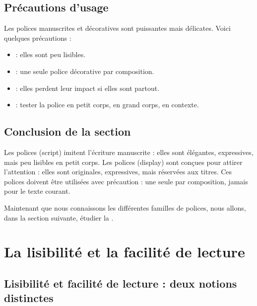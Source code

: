 \subsection{Précautions d'usage}

Les polices manuscrites et décoratives sont puissantes mais délicates. Voici quelques précautions :

\begin{itemize}
    \item {} : elles sont peu lisibles.
    \item {} : une seule police décorative par composition.
    \item {} : elles perdent leur impact si elles sont partout.
    \item {} : tester la police en petit corps, en grand corps, en contexte.
\end{itemize}

\subsection*{Conclusion de la section}

\begin{retenir}
Les polices  (script) imitent l'écriture manuscrite : elles sont élégantes, expressives, mais peu lisibles en petit corps. Les polices  (display) sont conçues pour attirer l'attention : elles sont originales, expressives, mais réservées aux titres. Ces polices doivent être utilisées avec précaution : une seule par composition, jamais pour le texte courant.
\end{retenir}

Maintenant que nous connaissons les différentes familles de polices, nous allons, dans la section suivante, étudier la .

\section{La lisibilité et la facilité de lecture}

\subsection{Lisibilité et facilité de lecture : deux notions distinctes}

